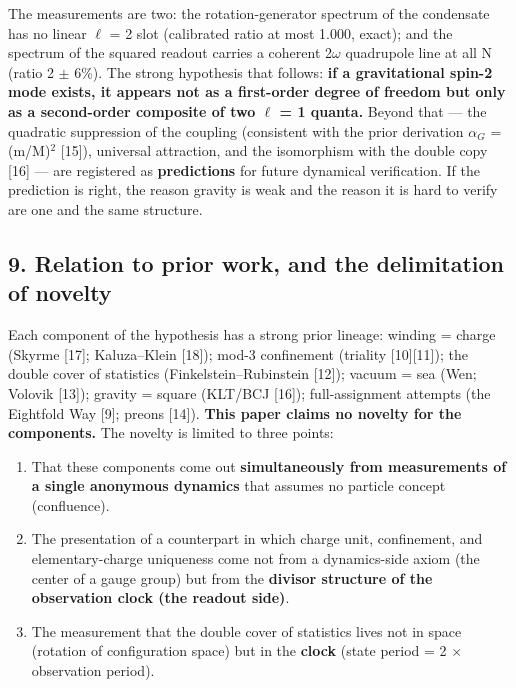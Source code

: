 \documentclass[
]{article}
\providecommand{\tightlist}{%
  \setlength{\itemsep}{0pt}\setlength{\parskip}{0pt}}
\begin{document}
The measurements are two: the rotation-generator spectrum of the
condensate has no linear \(\ell\) = 2 slot (calibrated ratio at most
1.000, exact); and the spectrum of the squared readout carries a
coherent 2\(\omega\) quadrupole line at all N (ratio 2 \(\pm\) 6\%). The
strong hypothesis that follows: \textbf{if a gravitational spin-2 mode
exists, it appears not as a first-order degree of freedom but only as a
second-order composite of two \(\ell\) = 1 quanta.} Beyond that --- the
quadratic suppression of the coupling (consistent with the prior
derivation \(\alpha_G\) = (m/M)\(^2\) {[}15{]}), universal attraction,
and the isomorphism with the double copy {[}16{]} --- are registered as
\textbf{predictions} for future dynamical verification. If the
prediction is right, the reason gravity is weak and the reason it is
hard to verify are one and the same structure.

\subsection{9. Relation to prior work, and the delimitation of
novelty}\label{relation-to-prior-work-and-the-delimitation-of-novelty}

Each component of the hypothesis has a strong prior lineage: winding =
charge (Skyrme {[}17{]}; Kaluza--Klein {[}18{]}); mod-3 confinement
(triality {[}10{]}{[}11{]}); the double cover of statistics
(Finkelstein--Rubinstein {[}12{]}); vacuum = sea (Wen; Volovik
{[}13{]}); gravity = square (KLT/BCJ {[}16{]}); full-assignment attempts
(the Eightfold Way {[}9{]}; preons {[}14{]}). \textbf{This paper claims
no novelty for the components.} The novelty is limited to three points:

\begin{enumerate}
\def\labelenumi{\arabic{enumi}.}
\tightlist
\item
  That these components come out \textbf{simultaneously from
  measurements of a single anonymous dynamics} that assumes no particle
  concept (confluence).
\item
  The presentation of a counterpart in which charge unit, confinement,
  and elementary-charge uniqueness come not from a dynamics-side axiom
  (the center of a gauge group) but from the \textbf{divisor structure
  of the observation clock (the readout side)}.
\item
  The measurement that the double cover of statistics lives not in space
  (rotation of configuration space) but in the \textbf{clock} (state
  period = 2 \(\times\) observation period).
\end{enumerate}
\end{document}
